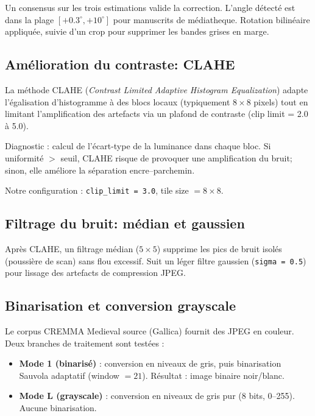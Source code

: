 ﻿\documentclass[twoside,twocolumn,10pt]{article}
\begin{document}
Un consensus sur les trois estimations valide la correction. L'angle détecté est dans la plage $[+0.3^{\circ}, +10^{\circ}]$ pour manuscrits de médiatheque. Rotation bilinéaire appliquée, suivie d'un crop pour supprimer les bandes grises en marge.

\subsection{Amélioration du contraste: CLAHE}

La méthode CLAHE (\textit{Contrast Limited Adaptive Histogram Equalization}) \cite{clahe1987} adapte l'égalisation d'histogramme à des blocs locaux (typiquement $8 \times 8$ pixels) tout en limitant l'amplification des artefacts via un plafond de contraste (clip limit = 2.0 à 5.0).

Diagnostic : calcul de l'écart-type de la luminance dans chaque bloc. Si uniformité $>$ seuil, CLAHE risque de provoquer une amplification du bruit; sinon, elle améliore la séparation encre--parchemin.

Notre configuration : \texttt{clip\_limit = 3.0}, tile size $= 8 \times 8$.

\subsection{Filtrage du bruit: médian et gaussien}

Après CLAHE, un filtrage médian ($5 \times 5$) supprime les pics de bruit isolés (poussière de scan) sans flou excessif. Suit un léger filtre gaussien (\texttt{sigma = 0.5}) pour lissage des artefacts de compression JPEG.

\subsection{Binarisation et conversion grayscale}

Le corpus CREMMA Medieval source (Gallica) fournit des JPEG en couleur. Deux branches de traitement sont testées :

\begin{itemize}
  \item \textbf{Mode 1 (binarisé)} : conversion en niveaux de gris, puis binarisation Sauvola adaptatif \cite{sauvola2000} (window $= 21$). Résultat : image binaire noir/blanc.
  \item \textbf{Mode L (grayscale)} : conversion en niveaux de gris pur (8 bits, 0--255). Aucune binarisation.
\end{itemize}
\end{document}
